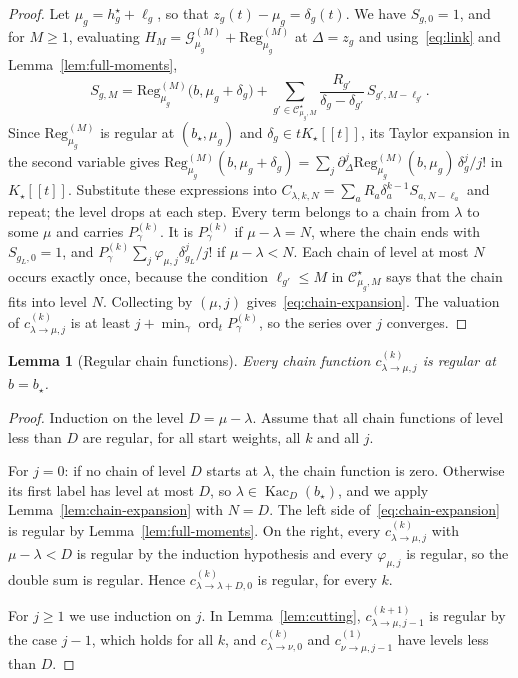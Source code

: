 \documentclass[twoside,10pt]{article}
\numberwithin{equation}{section}
\theoremstyle{slbody}
\newtheorem{lemma}[theorem]{Lemma}
\theoremstyle{definition}
\theoremstyle{remark}
\begin{document}
\begin{proof}
Let $\mu_g=h^\star_g+\ell_g$, so that $z_g(t)-\mu_g=\delta_g(t)$.  We have
$S_{g,0}=1$, and for $M\geq1$, evaluating $H_M={\mathcal G}^{(M)}_{\mu_g}+
\mathrm{Reg}^{(M)}_{\mu_g}$ at $\Delta=z_g$ and using~\eqref{eq:link} and
Lemma~\ref{lem:full-moments},
\[
 S_{g,M}=\mathrm{Reg}^{(M)}_{\mu_g}\bigl(b,\mu_g+\delta_g\bigr)
 +\sum_{g'\in{\mathcal C}^\star_{\mu_g,M}}\frac{R_{g'}}{\delta_g-\delta_{g'}}\,
 S_{g',M-\ell_{g'}} .
\]
Since $\mathrm{Reg}^{(M)}_{\mu_g}$ is regular at $(b_\star,\mu_g)$ and
$\delta_g\in tK_\star[[t]]$, its Taylor expansion in the second variable gives
$\mathrm{Reg}^{(M)}_{\mu_g}(b,\mu_g+\delta_g)
=\sum_j\partial_\Delta^j\mathrm{Reg}^{(M)}_{\mu_g}(b,\mu_g)\,\delta_g^j/j!$ in
$K_\star[[t]]$.  Substitute these expressions into
$C_{\lambda,k,N}=\sum_aR_a\delta_a^{k-1}S_{a,N-\ell_a}$ and repeat; the level
drops at each step.  Every term belongs to a chain from $\lambda$ to some
$\mu$ and carries $P^{(k)}_\gamma$.  It is $P^{(k)}_\gamma$ if
$\mu-\lambda=N$, where the chain ends with $S_{g_L,0}=1$, and
$P^{(k)}_\gamma\sum_j\varphi_{\mu,j}\delta_{g_L}^j/j!$ if $\mu-\lambda<N$.
Each chain of level at most $N$ occurs exactly once, because the condition
$\ell_{g'}\leq M$ in ${\mathcal C}^\star_{\mu_g,M}$ says that the chain fits
into level $N$.  Collecting by $(\mu,j)$ gives~\eqref{eq:chain-expansion}.
The valuation of $c^{(k)}_{\lambda\to\mu,j}$ is at least
$j+\min_\gamma\operatorname{ord}_tP^{(k)}_\gamma$, so the series over $j$
converges.
\end{proof}

\begin{lemma}[Regular chain functions]\label{lem:chain-regular}
Every chain function $c^{(k)}_{\lambda\to\mu,j}$ is regular at $b=b_\star$.
\end{lemma}

\begin{proof}
Induction on the level $D=\mu-\lambda$.  Assume that all chain functions of
level less than $D$ are regular, for all start weights, all $k$ and all $j$.

For $j=0$: if no chain of level $D$ starts at $\lambda$, the chain function is
zero.  Otherwise its first label has level at most $D$, so
$\lambda\in\operatorname{Kac}_D(b_\star)$, and we apply
Lemma~\ref{lem:chain-expansion} with $N=D$.  The left side
of~\eqref{eq:chain-expansion} is regular by Lemma~\ref{lem:full-moments}.  On
the right, every $c^{(k)}_{\lambda\to\mu,j}$ with $\mu-\lambda<D$ is regular by
the induction hypothesis and every $\varphi_{\mu,j}$ is regular, so the double
sum is regular.  Hence $c^{(k)}_{\lambda\to\lambda+D,0}$ is regular, for every
$k$.

For $j\geq1$ we use induction on $j$.  In Lemma~\ref{lem:cutting},
$c^{(k+1)}_{\lambda\to\mu,j-1}$ is regular by the case $j-1$, which holds for
all $k$, and $c^{(k)}_{\lambda\to\nu,0}$ and $c^{(1)}_{\nu\to\mu,j-1}$ have
levels less than $D$.
\end{proof}
\end{document}

